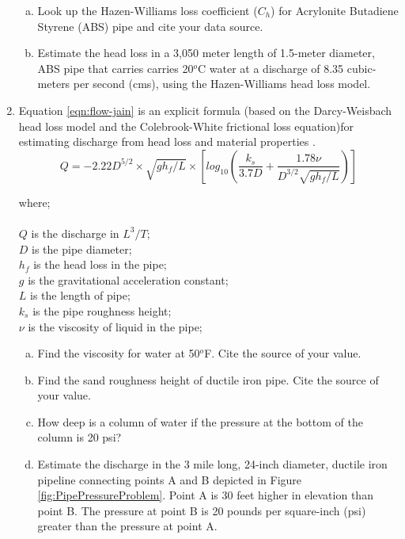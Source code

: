 \documentclass[12pt]{article}
\newcommand\tab[1][1cm]{\hspace*{#1}}
\begin{document}
\begin{enumerate}
\begin{enumerate}[(a)]
\item Look up the Hazen-Williams loss coefficient ($C_h$) for Acrylonite Butadiene Styrene (ABS) pipe and cite your data source.
\item Estimate the head loss in a 3,050 meter length of 1.5-meter diameter, ABS pipe that carries carries 20$^o$C water at a discharge of 8.35 cubic-meters per second (cms), using the Hazen-Williams head loss model.
\end{enumerate}
\clearpage
\item 
Equation \ref{eqn:flow-jain} is an explicit formula (based on the Darcy-Weisbach head loss model and the Colebrook-White frictional loss equation)for estimating discharge from head loss and material properties \citep{jain1976}.
\begin{equation}
Q=-2.22D^{5/2} \times \sqrt{gh_f/L}\times[log_{10} (\frac{k_s}{3.7D} + \frac{1.78\nu}{D^{3/2}\sqrt{gh_f/L}} )]
\label{eqn:flow-jain}
\end{equation}

where;\\~\\
\tab $Q$ is the discharge in $L^3/T$;\\
\tab $D$ is the pipe diameter; \\
\tab $h_f$ is the head loss in the pipe; \\
\tab $g$ is the gravitational acceleration constant; \\
\tab $L$ is the length of pipe; \\
\tab $k_s$ is the pipe roughness height; \\
\tab $\nu$ is the viscosity of liquid in the pipe; \\ 


\begin{enumerate}[(a)]
\item Find the viscosity for water at 50$^o$F.  Cite the source of your value. 
\item Find the sand roughness height of ductile iron pipe.  Cite the source of your value. 
\item How deep is a column of water if the pressure at the bottom of the column is 20 psi?
\item Estimate the discharge in the 3 mile long, 24-inch diameter, ductile iron pipeline connecting points A and B depicted in Figure \ref{fig:PipePressureProblem}.  Point A is 30 feet higher in elevation than point B.  The pressure at point B is 20 pounds per square-inch (psi) greater than the pressure at point A.
\end{enumerate}


\end{enumerate}
\end{document}
